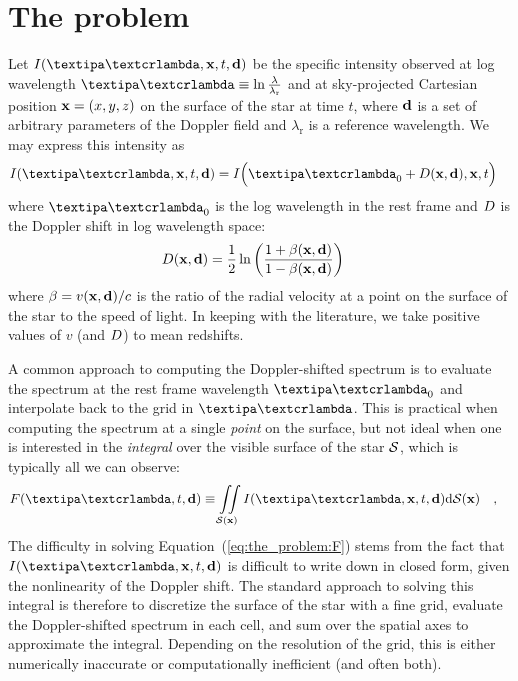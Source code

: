 \documentclass[modern]{aastex631}
\begin{document}
\section{The problem}
\label{sec:the_problem}
%
Let $I(\lnlam, \x, t, \Dargs)$ be the specific intensity observed at log wavelength $\lnlam \equiv \ln\frac{\lambda}{\lambda_\mathrm{r}}$ and at sky-projected Cartesian position ${\mathbf{x}} = (x, y, z)$ on the surface of the star at time $t$, where ${\mathbf{d}}$ is a set of arbitrary parameters of the Doppler field and $\lambda_\mathrm{r}$ is a reference wavelength.
We may express this intensity as
%
\begin{align}
    \label{eq:the_problem:Ixi}
    I(\lnlam, \x, t, \Dargs) & =
    I\Big(\lnlam_0 + \D(\x, \Dargs), \x, t\Big)
\end{align}
%
where $\lnlam_0$ is the log wavelength in the rest frame and $D$ is the Doppler shift in log wavelength space:
%
\begin{align}
    \label{eq:the_problem:D}
    D({\mathbf{x}}, {\mathbf{d}})
     & =
    \frac{1}{2}\ln\left(
    \frac{1 + \beta({\mathbf{x}}, {\mathbf{d}})}{1 - \beta({\mathbf{x}},
            {\mathbf{d}})}
    \right)
\end{align}
%
where $\beta = v({\mathbf{x}}, {\mathbf{d}}) / c$ is the ratio of the radial velocity at a point on the surface of the star to the speed of light.
In keeping with the literature, we take positive values of $v$ (and $D$) to mean redshifts.

A common approach to computing the Doppler-shifted spectrum is to evaluate the spectrum at the rest frame wavelength $\lnlam_0$ and interpolate back to the grid in $\lnlam$. 
This is practical when computing the spectrum at a single \emph{point} on the surface, but not ideal when one is interested in the \emph{integral} over the visible surface of the star $\mathcal{S}$, which is typically all we can observe:
%
\begin{align}
    \label{eq:the_problem:F}
    F(\lnlam, t, \Dargs)
     & \equiv
    \iint\limits_{\Surf(\x)}
    I(\lnlam, \x, t, \Dargs)
    \mathrm{d}{\Surf(\x)}
    \quad ,
\end{align}
%
The difficulty in solving Equation~(\ref{eq:the_problem:F}) stems from the fact that $I(\lnlam, \x, t, \Dargs)$ is difficult to write down in closed form, given the nonlinearity of the Doppler shift.
The standard approach to solving this integral is therefore to discretize the surface of the star with a fine grid, evaluate the Doppler-shifted spectrum in each cell, and sum over the spatial axes to approximate the integral. 
Depending on the resolution of the grid, this is either numerically inaccurate or computationally inefficient (and often both).
\end{document}
